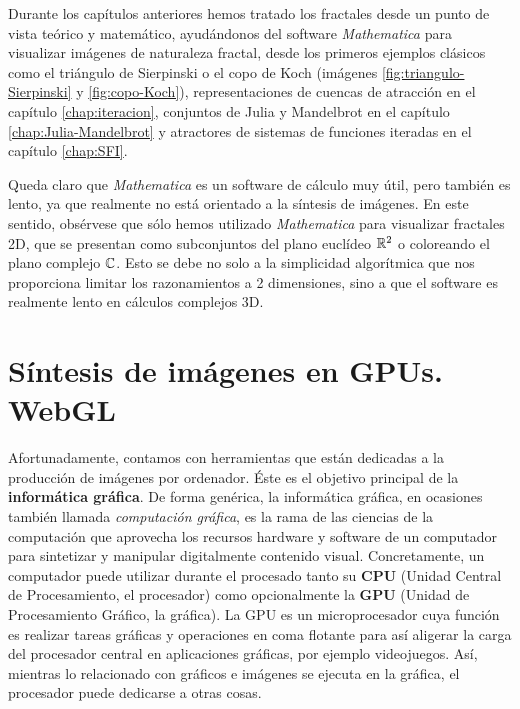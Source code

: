 %
%

Durante los capítulos anteriores hemos tratado los fractales desde un punto de vista teórico y matemático, ayudándonos del software \textit{Mathematica} para visualizar imágenes de naturaleza fractal, desde los primeros ejemplos clásicos como el triángulo de Sierpinski o el copo de Koch (imágenes \ref{fig:triangulo-Sierpinski} y \ref{fig:copo-Koch}), representaciones de cuencas de atracción en el capítulo \ref{chap:iteracion}, conjuntos de Julia y Mandelbrot en el capítulo \ref{chap:Julia-Mandelbrot} y atractores de sistemas de funciones iteradas en el capítulo \ref{chap:SFI}.

Queda claro que \textit{Mathematica} es un software de cálculo muy útil, pero también es lento, ya que realmente no está orientado a la síntesis de imágenes. En este sentido, obsérvese que sólo hemos utilizado \textit{Mathematica} para visualizar fractales 2D, que se presentan como subconjuntos del plano euclídeo $\mathbb{R}^2$ o coloreando el plano complejo $\mathbb{C}$. Esto se debe no solo a la simplicidad algorítmica que nos proporciona limitar los razonamientos a 2 dimensiones, sino a que el software es realmente lento en cálculos complejos 3D.

\section{Síntesis de imágenes en GPUs. WebGL}

Afortunadamente, contamos con herramientas que están dedicadas a la producción de imágenes por ordenador. Éste es el objetivo principal de la \textbf{informática gráfica}. De forma genérica, la informática gráfica, en ocasiones también llamada \textit{computación gráfica}, es la rama de las ciencias de la computación que aprovecha los recursos hardware y software de un computador para sintetizar y manipular digitalmente contenido visual. Concretamente, un computador puede utilizar durante el procesado tanto su \textbf{CPU} (Unidad Central de Procesamiento, el procesador) como opcionalmente la \textbf{GPU} (Unidad de Procesamiento Gráfico, la gráfica). La GPU es un microprocesador cuya función es realizar tareas gráficas y operaciones en coma flotante para así aligerar la carga del procesador central en aplicaciones gráficas, por ejemplo videojuegos. Así, mientras lo relacionado con gráficos e imágenes se ejecuta en la gráfica, el procesador puede dedicarse a otras cosas.


